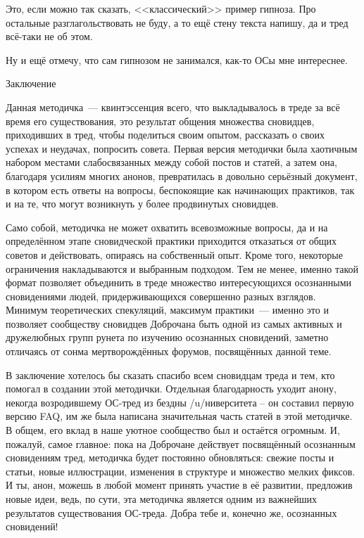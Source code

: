 \documentclass[a5paper,12pt,twoside]{memoir}
\begin{document}
Это, если можно так сказать, <<классический>> пример гипноза. Про остальные разглагольствовать не буду, а то ещё стену текста напишу, да и тред всё-таки не об этом.

Ну и ещё отмечу, что сам гипнозом не занимался, как-то ОСы мне интереснее.



\cleardoublepage

{\large\textsf{Заключение}}

\bigskip

\thispagestyle{empty}

Данная методичка~--- квинтэссенция всего, что выкладывалось в треде за всё время его существования, это результат общения множества сновидцев, приходивших в тред, чтобы поделиться своим опытом, рассказать о своих успехах и неудачах, попросить совета. Первая версия методички была хаотичным набором местами слабосвязанных между собой постов и статей, а затем она, благодаря усилиям многих анонов, превратилась в довольно серьёзный документ, в котором есть ответы на вопросы, беспокоящие как начинающих практиков, так и на те, что могут возникнуть у более продвинутых сновидцев.

Само собой, методичка не может охватить всевозможные вопросы, да и на определённом этапе сновидческой практики приходится отказаться от общих советов и действовать, опираясь на собственный опыт. Кроме того, некоторые ограничения накладываются и выбранным подходом. Тем не менее, именно такой формат позволяет объединить в треде множество интересующихся осознанными сновидениями людей, придерживающихся совершенно разных взглядов. Минимум теоретических спекуляций, максимум практики~--- именно это и позволяет сообществу сновидцев Доброчана быть одной из самых активных и дружелюбных групп рунета по изучению осознанных сновидений, заметно отличаясь от сонма мертворождённых форумов,  посвящённых данной теме.


В заключение хотелось бы сказать спасибо всем сновидцам треда и тем, кто помогал в создании этой методички. Отдельная благодарность уходит анону, некогда возродившему ОС-тред из бездны /u/ни\-вер\-си\-те\-та – он составил первую версию FAQ, им же была написана значительная часть статей в этой методичке. В общем, его вклад в наше уютное сообщество был и остаётся огромным. И, пожалуй, самое главное: пока на Доброчане действует посвящённый осознанным сновидениям тред, методичка будет постоянно обновляться: свежие посты и статьи, новые иллюстрации, изменения в структуре и множество мелких фиксов. И ты, анон, можешь в любой момент принять участие в её развитии, предложив новые идеи, ведь, по сути, эта методичка является одним из важнейших результатов существования ОС-треда. Добра тебе и, конечно же, осознанных сновидений!

\thispagestyle{empty}
\end{document}
